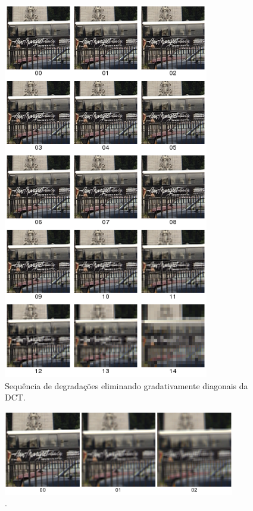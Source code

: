 \begin{figure}[!htb]
	\centering
	\includegraphics[width=0.8\textwidth]{./imgs/blockbus.png}
	\caption{Sequência de degradações eliminando gradativamente diagonais da DCT.}
	\label{fig:blockbus}
\end{figure}

\begin{figure}[!htb]
	\centering
	\includegraphics[width=0.9\textwidth]{./imgs/bluraverage.png}
	\caption{.}
	\label{fig:bluraverage}
\end{figure}

